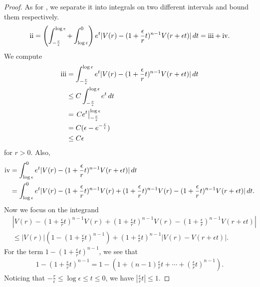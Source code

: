 \documentclass[12pt,reqno]{amsart}
\numberwithin{figure}{section}
\theoremstyle{plain}
\numberwithin{equation}{section}
\newcommand{\RNum}[1]{\uppercase\expandafter{\romannumeral #1\relax}}
\begin{document}
\begin{proof}
As for \RNum{2}, we separate it into integrals on two different intervals and bound them respectively. 
\begin{equation*}
    \text{\RNum{2}} = \left(\int_{-\frac{r}{\epsilon}}^{\log\epsilon}+\int_{\log{\epsilon}}^0\right)e^t|V(r)-(1+\frac{\epsilon}{r}t)^{n-1}V(r+\epsilon t)|\,dt
    = \text{\RNum{3}}+\text{\RNum{4}}.
\end{equation*}
We compute
\begin{equation*}
\begin{aligned}
    \text{\RNum{3}}&=\int_{-\frac{r}{\epsilon}}^{\log\epsilon}e^t|V(r)-(1+\frac{\epsilon}{r}t)^{n-1}V(r+\epsilon t)|\,dt\\
    &\le C\int_{-\frac{r}{\epsilon}}^{\log\epsilon}e^t\,dt\\
    &= \left.Ce^t \right|_{-\frac{r}{\epsilon}}^{\log{\epsilon}}\\
    &= C(\epsilon-e^{-\frac{r}{\epsilon}})\\
    &\le C\epsilon
\end{aligned}
\end{equation*}
for $r>0$.
Also, 
\begin{equation*}
\begin{aligned}
    \text{\RNum{4}}&= \int_{\log\epsilon}^{0}e^t|V(r)-(1+\frac{\epsilon}{r}t)^{n-1}V(r+\epsilon t)|\,dt\\
    &= \int_{\log\epsilon}^{0}e^t|V(r)-(1+\frac{\epsilon}{r}t)^{n-1}V(r)+(1+\frac{\epsilon}{r}t)^{n-1}V(r)-(1+\frac{\epsilon}{r}t)^{n-1}V(r+\epsilon t)|\,dt.
\end{aligned}
\end{equation*}
Now we focus on the integrand
\begin{equation*}
\begin{aligned}
    &|V(r)-(1+\frac{\epsilon}{r}t)^{n-1}V(r)+(1+\frac{\epsilon}{r}t)^{n-1}V(r)-(1+\frac{\epsilon}{r})^{n-1}V(r+\epsilon t)|\\
    &\le |V(r)|(1-(1+\frac{\epsilon}{r}t)^{n-1})+(1+\frac{\epsilon}{r}t)^{n-1}|V(r)-V(r+\epsilon t)|.
\end{aligned}
\end{equation*}
For the term $1-(1+\frac{\epsilon}{r}t)^{n-1}$, we see that 
\begin{equation*}
\begin{aligned}
    1-(1+\frac{\epsilon}{r}t)^{n-1}=1-(1+(n-1)\frac{\epsilon}{r}t+\cdots+(\frac{\epsilon}{r}t)^{n-1}).
\end{aligned}
\end{equation*}
Noticing that $-\frac{r}{\epsilon}\le \log{\epsilon}\le t\le 0$, we have $|\frac{\epsilon}{r}t|\le 1$.

\end{proof}
\end{document}

